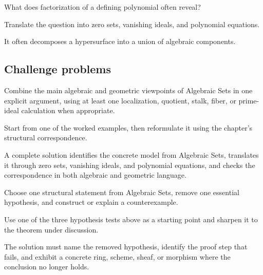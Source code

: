 \begin{exercise}\label{exr:vi01-expand-14}
What does factorization of a defining polynomial often reveal?
\end{exercise}
\begin{hint}
Translate the question into zero sets, vanishing ideals, and polynomial equations.
\end{hint}
\begin{solution}
It often decomposes a hypersurface into a union of algebraic components.
\end{solution}

\subsection*{Challenge problems}

\begin{exercise}\label{exr:vi01-expand-15}
Combine the main algebraic and geometric viewpoints of Algebraic Sets in one explicit argument, using at least one localization, quotient, stalk, fiber, or prime-ideal calculation when appropriate.
\end{exercise}
\begin{hint}
Start from one of the worked examples, then reformulate it using the chapter's structural correspondence.
\end{hint}
\begin{solution}
A complete solution identifies the concrete model from Algebraic Sets, translates it through zero sets, vanishing ideals, and polynomial equations, and checks the correspondence in both algebraic and geometric language.
\end{solution}

\begin{exercise}\label{exr:vi01-expand-16}
Choose one structural statement from Algebraic Sets, remove one essential hypothesis, and construct or explain a counterexample.
\end{exercise}
\begin{hint}
Use one of the three hypothesis tests above as a starting point and sharpen it to the theorem under discussion.
\end{hint}
\begin{solution}
The solution must name the removed hypothesis, identify the proof step that fails, and exhibit a concrete ring, scheme, sheaf, or morphism where the conclusion no longer holds.
\end{solution}

